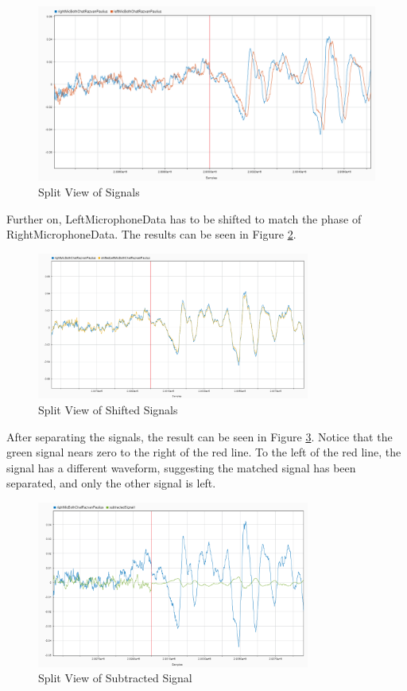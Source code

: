 \begin{figure}[htp]
	\centering
	\includegraphics[width=\textwidth]{Illustrations/twoSourcesAndJustOneLater.png}
	\caption{Split View of Signals}
	\label{fig:SplitTwoSources}
\end{figure}
\newpage
Further on, LeftMicrophoneData has to be shifted to match the phase of RightMicrophoneData.
The results can be seen in Figure \ref{fig:SplitShifted}.
\begin{figure}[htp]
	\centering
	\includegraphics[width=0.8\textwidth]{Illustrations/shiftedLeftAndRightSplitView.png}
	\caption{Split View of Shifted Signals}
	\label{fig:SplitShifted}
\end{figure}

After separating the signals, the result can be seen in Figure \ref{fig:SplitSeparated}.
Notice that the green signal nears zero to the right of the red line. To the left of the
red line, the signal has a different waveform, suggesting the matched signal has been
separated, and only the other signal is left.

\begin{figure}[htp]
	\centering
	\includegraphics[width=0.8\textwidth]{Illustrations/rightAndSubtractedSplitView.png}
	\caption{Split View of Subtracted Signal}
	\label{fig:SplitSeparated}
\end{figure}
\newpage

